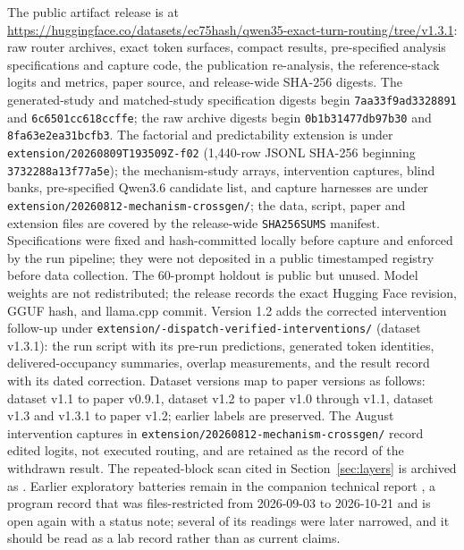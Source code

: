 \documentclass[10pt,a4paper,twocolumn]{article}
\begin{document}
The public artifact release is at
\url{https://huggingface.co/datasets/ec75hash/qwen35-exact-turn-routing/tree/v1.3.1}:
raw router archives, exact token surfaces, compact results, pre-specified
analysis specifications and capture code, the publication re-analysis, the
reference-stack logits and metrics, paper source, and release-wide SHA-256
digests. The generated-study and matched-study specification digests begin
\texttt{7aa33f9ad3328891} and \texttt{6c6501cc618ccffe}; the raw archive
digests begin \texttt{0b1b31477db97b30} and \texttt{8fa63e2ea31bcfb3}. The
factorial and predictability extension is under
\texttt{extension/20260809T193509Z-f02} (1,440-row JSONL SHA-256 beginning
\texttt{3732288a13f77a5e}); the mechanism-study arrays, intervention captures,
blind banks, pre-specified Qwen3.6 candidate list, and capture harnesses are
under \texttt{extension/20260812-mechanism-crossgen/}; the data, script, paper and extension files are covered by
the release-wide \texttt{SHA256SUMS} manifest. Specifications were fixed and
hash-committed locally before capture and enforced by the run pipeline; they
were not deposited in a public timestamped registry before data collection.
The 60-prompt holdout is public but unused. Model weights are not
redistributed; the release records the exact Hugging Face revision, GGUF hash,
and llama.cpp commit. Version 1.2 adds the corrected intervention follow-up
under \texttt{extension/-dispatch-verified-interventions/} (dataset
v1.3.1): the run script with its pre-run predictions, generated token
identities, delivered-occupancy summaries, overlap measurements, and the
result record with its dated correction. Dataset versions map to paper
versions as follows: dataset v1.1 to paper v0.9.1, dataset v1.2 to paper
v1.0 through v1.1, dataset v1.3 and v1.3.1 to paper v1.2; earlier labels are
preserved. The August intervention captures in
\texttt{extension/20260812-mechanism-crossgen/} record edited logits, not
executed routing, and are retained as the record of the withdrawn result.
The repeated-block scan cited in Section~\ref{sec:layers} is archived as
\cite{shorthill2026blocks}. Earlier exploratory batteries remain in the
companion technical report \cite{shorthill2026}, a program record that was
files-restricted from 2026-09-03 to 2026-10-21 and is open again with a
status note; several of its readings were later narrowed, and it should be
read as a lab record rather than as current claims.
\end{document}
